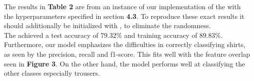 The results in \textbf{Table 2} are from an instance of our implementation of the  with the hyperparameters specified in section \textbf{4.3}.
To reproduce these exact results it should additionally be initialized with , to eliminate the randomness. \\

The  achieved a test accuracy of $79.32\%$ and training accuracy of $89.83\%$.
Furthermore, our model emphasizes the difficulties in correctly classifying shirts, as seen by the precision, recall and f1-score.
This fits well with the feature overlap seen in \textbf{Figure 3}.
On the other hand, the model performs well at classifying the other classes especially trousers.







